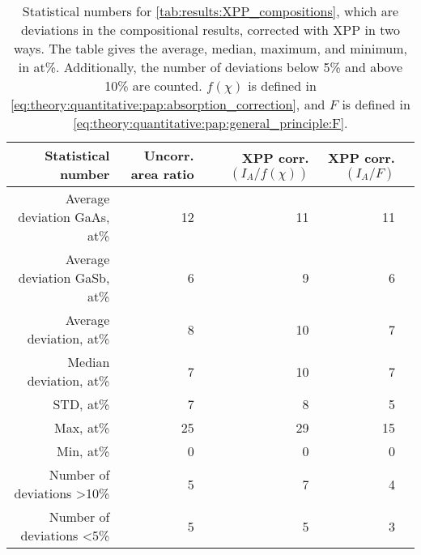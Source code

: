 \begin{table}[phtb]
    \begin{center}
        \caption{
            Statistical numbers for \cref{tab:results:XPP_compositions}, which are deviations in the compositional results, corrected with XPP in two ways.
            The table gives the average, median, maximum, and minimum, in at\%. Additionally, the number of deviations below 5\% and above 10\% are counted.
            $f(\chi)$ is defined in \cref{eq:theory:quantitative:pap:absorption_correction}, and $F$ is defined in \cref{eq:theory:quantitative:pap:general_principle:F}.
        }
        \label{tab:results:XPP_compositions_stats}
        \begin{tabular}{rrrrr}
            \hline
            \textbf{Statistical number}  & \textbf{Uncorr. area ratio} & \textbf{XPP corr. $(I_A/f(\chi))$} & \textbf{XPP corr. $(I_A/F)$} \\
            \hline
            Average deviation GaAs, at\% & 12                          & 11                                 & 11                           \\
            Average deviation GaSb, at\% & 6                           & 9                                  & 6                            \\
            Average deviation, at\%      & 8                           & 10                                 & 7                            \\
            Median deviation, at\%       & 7                           & 10                                 & 7                            \\
            STD, at\%                    & 7                           & 8                                  & 5                            \\
            Max, at\%                    & 25                          & 29                                 & 15                           \\
            Min, at\%                    & 0                           & 0                                  & 0                            \\
            Number of deviations >10\%   & 5                           & 7                                  & 4                            \\
            Number of deviations  <5\%   & 5                           & 5                                  & 3                            \\
            \hline
        \end{tabular}
    \end{center}
\end{table}

